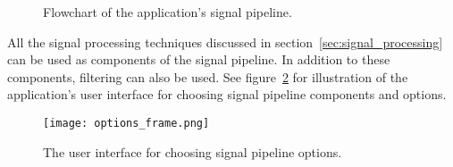 \begin{figure}[h!]
	
	\caption{Flowchart of the application's signal pipeline.}
	\label{fig:signal_pipeline}
\end{figure}

All the signal processing techniques discussed in section~\ref{sec:signal_processing} can be used as components of the signal pipeline. In addition to these components, filtering can also be used. See figure~\ref{fig:options_frame} for illustration of the application's user interface for choosing signal pipeline components and options.

\begin{figure}[h]
	\centering
	\texttt{[image: options\_frame.png]}
	\caption{The user interface for choosing signal pipeline options.}
	\label{fig:options_frame}
\end{figure}

